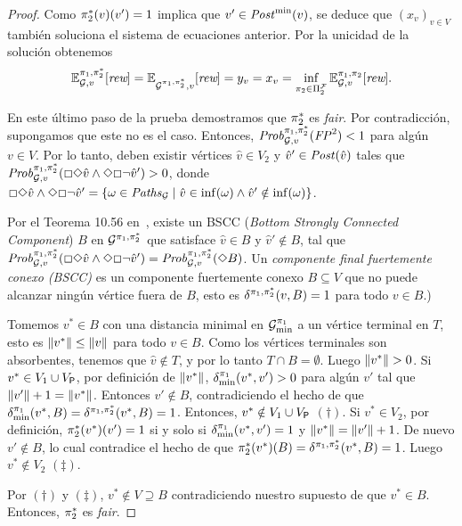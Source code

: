 \begin{proof}
  Como $\pi^*_{2}(v)(v') = 1$ implica que $v'\in\mathit{Post}^{\min}(v)$,
  se deduce que $(x_v)_{v\in V}$ también soluciona el sistema de ecuaciones anterior.  Por la unicidad de la solución obtenemos
  \[\mathbb{E}^{\pi_{1}, \pi^*_{2}}_{\mathcal{G},v}[\textit{rew}] = 
    \mathbb{E}^{}_{\mathcal{G}^{\pi_{1},\pi^*_{2}},v}[\textit{rew}] =
    y_v = x_v =
    \inf_{\pi_{2} \in \Pi^{\mathcal{F}}_{2}} \mathbb{E}^{\pi_{1}, \pi_{2}}_{\mathcal{G},v}[\textit{rew}].
  \]

  En este último paso de la prueba demostramos que $\pi^*_{2}$ es \textit{fair}.
  Por contradicción, supongamos que este no es el caso.  Entonces,
  $\mathit{Prob}^{\pi_{1}, \pi^*_{2}}_{\mathcal{G},v}(\mathit{FP}^2) < 1$ para algún
  $v\in V$.  Por lo tanto, deben existir vértices $\hat{v}\in V_2$
  y $\hat{v}'\in\mathit{Post}(\hat{v})$ tales que 
  $\mathit{Prob}^{\pi_{1}, \pi^*_{2}}_{\mathcal{G},v}({\Box\Diamond\hat{v}}\land{\Diamond\Box\neg\hat{v}'})>0$,
  donde
  ${\Box\Diamond\hat{v}}\land{\Diamond\Box\neg\hat{v}'} =\{ {\omega\in\mathit{Paths}_{\mathcal{G}}} \mid {\hat{v} \in \inf(\omega)} \land {\hat{v}' \notin \inf(\omega)} \}$.

  Por el Teorema 10.56 en~\cite{BaierK08}, existe un BSCC (\textit{Bottom Strongly Connected Component})
  $B$ en $\mathcal{G}^{\pi_{1},\pi^*_{2}}$ que satisface $\hat{v}\in
  B$ y $\hat{v}'\notin B$, tal que
  $\mathit{Prob}^{\pi_{1}, \pi^*_{2}}_{\mathcal{G},v}({\Box\Diamond\hat{v}}\land{\Diamond\Box\neg\hat{v}'})
  = \mathit{Prob}^{\pi_{1}, \pi^*_{2}}_{\mathcal{G},v}({\Diamond B})$.
%
  Un \emph{componente final fuertemente conexo (BSCC)} es un componente fuertemente conexo $B\subseteq V$ que no puede alcanzar ningún vértice fuera de $B$, esto es $\delta^{\pi_{1},\pi^*_{2}}(v,B)=1$
  para todo $v\in B$.)

  Tomemos $v^*\in B$ con una distancia minimal en
  $\mathcal{G}^{\pi_{1}}_{\min}$ a un vértice terminal en $T$, esto es
  ${\lVert{v^*}\rVert}\leq{\lVert{v}\rVert}$ para todo $v\in B$.  Como los vértices terminales son absorbentes, tenemos que $\hat{v}\notin T$, y por lo tanto
  $T\cap B=\emptyset$.  Luego ${\lVert{v^*}\rVert}>0$.
  Si $v^*\in V_1 \cup V_{\mathsf{P}}$, por definición de
  ${\lVert{v^*}\rVert}$, $\delta^{\pi_{1}}_{\min}(v^*,v')>0$
  para algún $v'$ tal que ${\lVert{v'}\rVert}+1={\lVert{v^*}\rVert}$. Entonces
  $v'\notin B$, contradiciendo el hecho de que
  $\delta^{\pi_{1}}_{\min}(v^*,B)=\delta^{\pi_{1},\pi^*_{2}}(v^*,B)=1$.
  Entonces, $v^*\notin V_1 \cup V_{\mathsf{P}}$ $(\dagger)$.
  Si $v^*\in V_2$, por definición,
  $\pi^*_{2}(v^*)(v')=1$ si y solo si
  $\delta^{\pi_{1}}_{\min}(v^*,v')=1$ y
  ${\lVert{v^*}\rVert}={\lVert{v'}\rVert}+1$. De nuevo $v'\notin B$, 
  lo cual contradice el hecho de que
  $\pi^*_{2}(v^*)(B)=\delta^{\pi_{1},\pi^*_{2}}(v^*,B)=1$.
  Luego $v^*\notin V_2$ $(\ddagger)$.
  
  Por $(\dagger)$ y $(\ddagger)$, $v^*\notin V \supseteq B$
  contradiciendo nuestro supuesto de que $v^*\in B$.  Entonces,
  $\pi^*_{2}$ es \textit{fair}.
  \qedhere
\end{proof}
